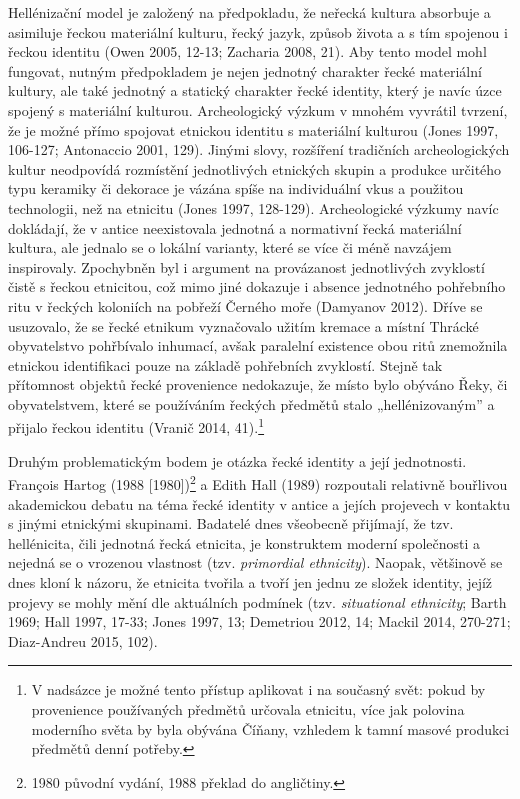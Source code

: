 Hellénizační model je založený na předpokladu, že neřecká kultura absorbuje a asimiluje řeckou materiální kulturu, řecký jazyk, způsob života a s tím spojenou i řeckou identitu (Owen 2005, 12-13; Zacharia 2008, 21). Aby tento model mohl fungovat, nutným předpokladem je nejen jednotný charakter řecké materiální kultury, ale také jednotný a statický charakter řecké identity, který je navíc úzce spojený s materiální kulturou. Archeologický výzkum v mnohém vyvrátil tvrzení, že je možné přímo spojovat etnickou identitu s materiální kulturou (Jones 1997, 106-127; Antonaccio 2001, 129). Jinými slovy, rozšíření tradičních archeologických kultur neodpovídá rozmístění jednotlivých etnických skupin a produkce určitého typu keramiky či dekorace je vázána spíše na individuální vkus a použitou technologii, než na etnicitu (Jones 1997, 128-129). Archeologické výzkumy navíc dokládají, že v antice neexistovala jednotná a normativní řecká materiální kultura, ale jednalo se o lokální varianty, které se více či méně navzájem inspirovaly. Zpochybněn byl i argument na provázanost jednotlivých zvyklostí čistě s řeckou etnicitou, což mimo jiné dokazuje i absence jednotného pohřebního ritu v řeckých koloniích na pobřeží Černého moře (Damyanov 2012). Dříve se usuzovalo, že se řecké etnikum vyznačovalo užitím kremace a místní Thrácké obyvatelstvo pohřbívalo inhumací, avšak paralelní existence obou ritů znemožnila etnickou identifikaci pouze na základě pohřebních zvyklostí. Stejně tak přítomnost objektů řecké provenience nedokazuje, že místo bylo obýváno Řeky, či obyvatelstvem, které se používáním řeckých předmětů stalo „hellénizovaným” a přijalo řeckou identitu (Vranič 2014, 41).\footnote{V nadsázce je možné tento přístup aplikovat i na současný svět: pokud by provenience používaných předmětů určovala etnicitu, více jak polovina moderního světa by byla obývána Číňany, vzhledem k tamní masové produkci předmětů denní potřeby.}

Druhým problematickým bodem je otázka řecké identity a její jednotnosti. François Hartog (1988 {[}1980{]})\footnote{1980 původní vydání, 1988 překlad do angličtiny.} a Edith Hall (1989) rozpoutali relativně bouřlivou akademickou debatu na téma řecké identity v antice a jejích projevech v kontaktu s jinými etnickými skupinami. Badatelé dnes všeobecně přijímají, že tzv. hellénicita, čili jednotná řecká etnicita, je konstruktem moderní společnosti a nejedná se o vrozenou vlastnost (tzv. {\em primordial ethnicity}). Naopak, většinově se dnes kloní k názoru, že etnicita tvořila a tvoří jen jednu ze složek identity, jejíž projevy se mohly mění dle aktuálních podmínek (tzv. {\em situational ethnicity}; Barth 1969; Hall 1997, 17-33; Jones 1997, 13; Demetriou 2012, 14; Mackil 2014, 270-271; Diaz-Andreu 2015, 102).

